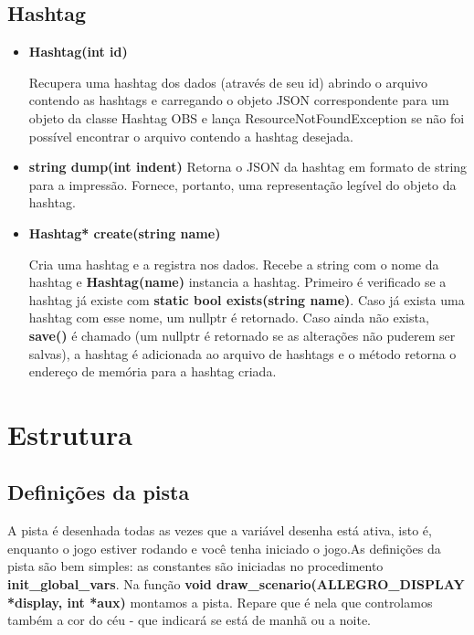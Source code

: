\documentclass[a4paper]{article}
\begin{document}
\subsection{Hashtag}

\begin{itemize}
    \item \textbf{Hashtag(int id)}

    Recupera uma hashtag dos dados (através de seu id) abrindo o arquivo contendo as hashtags e carregando o objeto JSON correspondente para um objeto da classe Hashtag OBS e lança ResourceNotFoundException se não foi possível encontrar o arquivo contendo a hashtag desejada.

    \item \textbf{string dump(int indent)}
    Retorna o JSON da hashtag em formato de string para a impressão. Fornece, portanto, uma representação legível do objeto da hashtag.

    \item \textbf{Hashtag* create(string name)}

    Cria uma hashtag e a registra nos dados. Recebe a string com o nome da hashtag e \textbf{Hashtag(name)} instancia a hashtag. Primeiro é verificado se a hashtag já existe com \textbf{static bool exists(string name)}. Caso já exista uma hashtag com esse nome, um nullptr é retornado. Caso ainda não exista, \textbf{save()} é chamado (um nullptr é retornado se as alterações não puderem ser salvas), a hashtag é adicionada ao arquivo de hashtags e o método retorna o endereço de memória para a hashtag criada.

\end{itemize}


\section{Estrutura}
\subsection{Definições da pista}
A pista é desenhada todas as vezes que a variável desenha está ativa, isto é, enquanto o jogo estiver rodando e você tenha iniciado o jogo.As definições da pista são bem simples: as constantes são iniciadas no procedimento \textbf{init\_global\_vars}.
Na função \textbf{void draw\_scenario(ALLEGRO\_DISPLAY *display, int *aux)} montamos a pista. Repare que é nela que controlamos também a cor do céu - que indicará se está de manhã ou a noite.
\end{document}
